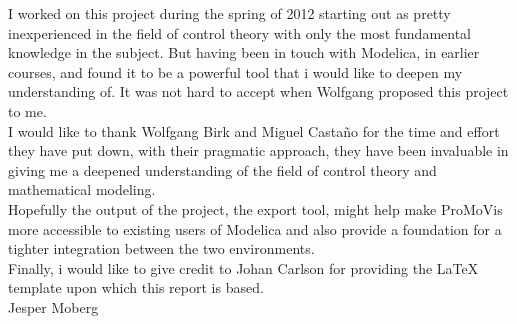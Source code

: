 I worked on this project during the spring of 2012 starting out as pretty inexperienced in the field of control theory with only the most fundamental knowledge in the subject. But having been in touch with Modelica, in earlier courses, and found it to be a powerful tool that i would like to deepen my understanding of. It was not hard to accept when Wolfgang proposed this project to me.\\\newline I would like to thank Wolfgang Birk and Miguel Casta{\~{n}}o for the time and effort they have put down,  with their pragmatic approach, they have been invaluable in giving me a deepened understanding of the field of control theory and mathematical modeling.\\\newline Hopefully the output of the project, the export tool, might help make ProMoVis more accessible to existing users of Modelica and also provide a foundation for a tighter integration between the two environments.\\\newline Finally, i would like to give credit to Johan Carlson for providing the \LaTeX{} template upon which this report is based. \\\newline
\vspace*{2cm}%
\hfill Jesper Moberg
